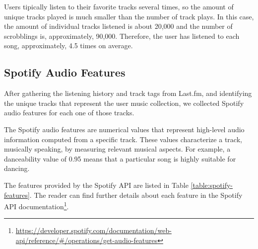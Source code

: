 \documentclass[sn-mathphys]{sn-jnl}%
\theoremstyle{thmstyleone}%
\theoremstyle{thmstyletwo}%
\theoremstyle{thmstylethree}%
\begin{document}
Users tipically listen to their favorite tracks several times,
so the amount of unique tracks played is much smaller
than the number of track plays. In this case, the amount of
individual tracks listened is about 20,000 and the number of scrobblings is, approximately, 90,000.
Therefore, the user has listened to each song, approximately, 4.5 times on average.


\subsection{Spotify Audio Features}

After gathering the listening history and track tags from Last.fm, and identifying the unique
tracks that represent the user music collection, we
collected Spotify audio features for each one of those tracks.

The Spotify audio features are numerical values that represent high-level audio information computed from a specific
track. These values characterize a track, musically speaking,
by measuring relevant musical aspects.
For example, a danceability value of 0.95 means
that a particular song is highly suitable for dancing.

The features provided by the Spotify API are listed in
Table \ref{table:spotify-features}.
The reader can find further details about each feature in the Spotify API documentation\footnote[5]{
      \url{https://developer.spotify.com/documentation/web-api/reference/\#/operations/get-audio-features}
}.
\end{document}
